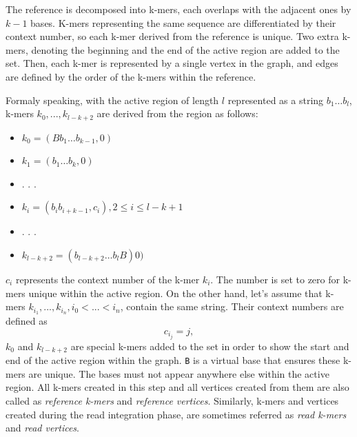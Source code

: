 The reference is decomposed into k-mers, each overlaps with the adjacent ones by $k-1$ bases. K-mers representing the same sequence are differentiated by their context number, so each k-mer derived from the reference is unique. Two extra k-mers, denoting the beginning and the end of the active region are added to the set. Then, each k-mer is represented by a single vertex in the graph, and edges are defined by the order of the k-mers within the reference.

Formaly speaking, with the active region of length $l$ represented as a string $b_1 \ldots b_{l}$, k-mers $k_0, ..., k_{l-k+2}$ are derived from the region as follows:
\begin{itemize}
\item $k_0 = (Bb_1 \ldots b_{k-1}, 0)$
\item $k_1 = (b_1 \ldots b_k, 0)$
\item . . .
\item $k_i = (b_i b_{i+k-1}, c_i), 2 \leq i \leq  l-k+1$
\item . . .
\item $k_{l-k+2} = (b_{l-k+2} \ldots b_lB) 0)$
\end{itemize}
$c_i$ represents the context number of the k-mer $k_i$. The number is set to zero for k-mers unique within the active region. On the other hand, let's assume that k-mers $k_{i_1}, ..., k_{i_n}, i_0 < ... < i_n$, contain the same string. Their context numbers are defined as
$$
c_{i_j} = j, 
$$
$k_0$ and $k_{l-k+2}$ are special k-mers added to the set in order to show the start and end of the active region within the graph. \texttt{B} is a virtual base that ensures these k-mers are unique. The bases must not appear anywhere else within the active region. All k-mers created in this step and all vertices created from them are also called as \textit{reference k-mers} and \textit{reference vertices}. Similarly, k-mers and vertices created during the read integration phase, are sometimes referred as \textit{read k-mers} and \textit{read vertices}.


